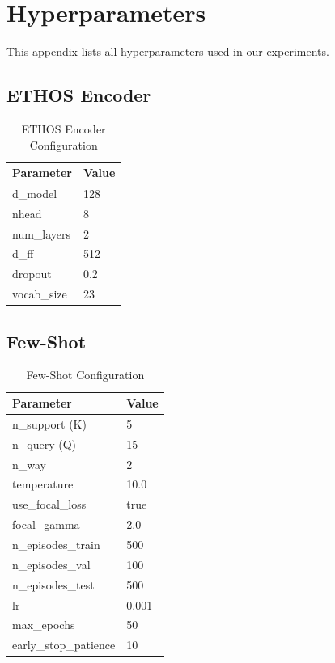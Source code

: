 \chapter{Hyperparameters}
\label{app:hyperparams}

This appendix lists all hyperparameters used in our experiments.

\section{ETHOS Encoder}

\begin{table}[h]
\centering
\caption{ETHOS Encoder Configuration}
\begin{tabular}{ll}
\toprule
Parameter & Value \\
\midrule
d\_model & 128 \\
nhead & 8 \\
num\_layers & 2 \\
d\_ff & 512 \\
dropout & 0.2 \\
vocab\_size & 23 \\
\bottomrule
\end{tabular}
\end{table}

\section{Few-Shot}

\begin{table}[h]
\centering
\caption{Few-Shot Configuration}
\begin{tabular}{ll}
\toprule
Parameter & Value \\
\midrule
n\_support (K) & 5 \\
n\_query (Q) & 15 \\
n\_way & 2 \\
temperature & 10.0 \\
use\_focal\_loss & true \\
focal\_gamma & 2.0 \\
n\_episodes\_train & 500 \\
n\_episodes\_val & 100 \\
n\_episodes\_test & 500 \\
lr & 0.001 \\
max\_epochs & 50 \\
early\_stop\_patience & 10 \\
\bottomrule
\end{tabular}
\end{table}

